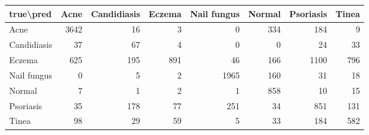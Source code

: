 \begin{tabular}{lrrrrrrr}
\toprule
true\textbackslash pred & Acne & Candidiasis & Eczema & Nail fungus & Normal & Psoriasis & Tinea \\
\midrule
Acne & 3642 & 16 & 3 & 0 & 334 & 184 & 9 \\
Candidiasis & 37 & 67 & 4 & 0 & 0 & 24 & 33 \\
Eczema & 625 & 195 & 891 & 46 & 166 & 1100 & 796 \\
Nail fungus & 0 & 5 & 2 & 1965 & 160 & 31 & 18 \\
Normal & 7 & 1 & 2 & 1 & 858 & 10 & 15 \\
Psoriasis & 35 & 178 & 77 & 251 & 34 & 851 & 131 \\
Tinea & 98 & 29 & 59 & 5 & 33 & 184 & 582 \\
\bottomrule
\end{tabular}
